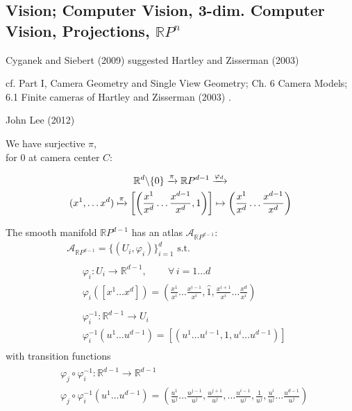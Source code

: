 \documentclass[10pt]{amsart}
\begin{document}
\begin{multicols*}{2}
\part{Vision; Computer Vision, 3-dim. Computer Vision, Projections, $\mathbb{R}P^n$}

Cyganek and Siebert (2009) \cite{CySi2009} suggested Hartley and Zisserman (2003) \cite{HaZi2003}

cf. Part I, Camera Geometry and Single View Geometry; Ch. 6 Camera Models; 6.1 Finite cameras of Hartley and Zisserman (2003) \cite{HaZi2003}.  

John Lee (2012) \cite{JLee2012}


We have surjective $\pi$, \\
for $0$ at camera center $C$:  

\begin{equation}
\begin{gathered}
	\mathbb{R}^d \backslash \lbrace 0 \rbrace \xrightarrow{ \pi } \mathbb{R}P^{d-1}  \xrightarrow{ \varphi_d } \\
	(x^1 , \dots x^d) \xmapsto{ \pi } \left[ \left( \frac{x^1}{x^d} \dots \frac{x^{d-1}}{x^d} , 1 \right) \right] \mapsto \left( \frac{x^1}{x^d} \dots \frac{x^{d-1}}{x^d} \right) 
\end{gathered}
\end{equation}

The smooth manifold $\mathbb{R}P^{d-1}$ has an atlas $\mathcal{A}_{\mathbb{R}P^{d-1}}$: 
\begin{equation}
\begin{gathered}
	\mathcal{A}_{\mathbb{R}P^{d-1} } = \lbrace ( U_i , \varphi_i) \rbrace_{i=1}^d \text{ s.t. } \\ 
\begin{gathered}
\begin{aligned}
	& \varphi_i: U_i \to \mathbb{R}^{d-1} , \qquad \, \forall \, i =1 \dots d \\
	& \varphi_i([x^1 \dots x^d]) = \left( \frac{x^1}{x^i} \dots \frac{x^{i-1}}{x^i} , \widehat{1}, \frac{x^{i+1}}{x^i} \dots \frac{x^d}{x^i} \right) 
\end{aligned} \\
\begin{aligned}
	& \varphi_i^{-1} : \mathbb{R}^{d-1} \to U_i \\ 
	& \varphi_i^{-1} (u^1\dots u^{d-1}) = [ (u^1 \dots u^{i-1}, 1, u^i \dots u^{d-1} )]  
\end{aligned}
\end{gathered}
\end{gathered}
\end{equation}
with transition functions
\[
\begin{gathered}
	\begin{aligned}
	& \varphi_j \circ \varphi_i^{-1} : \mathbb{R}^{d-1} \to \mathbb{R}^{d-1} \\ 
	& \varphi_j \circ \varphi_i^{-1} (u^1 \dots u^{d-1}) = \left( \frac{u^1}{u^j} \dots \frac{u^{j-1}}{u^j}  , \frac{u^{j+1}}{u^j}  , \dots \frac{u^{i-1}}{u^j} , \frac{1}{u^j} , \frac{u^i}{u^j}   \dots \frac{u^{d-1}}{u^j}  \right)
\end{aligned}
\end{gathered}
\]


\end{multicols*}
\end{document}
